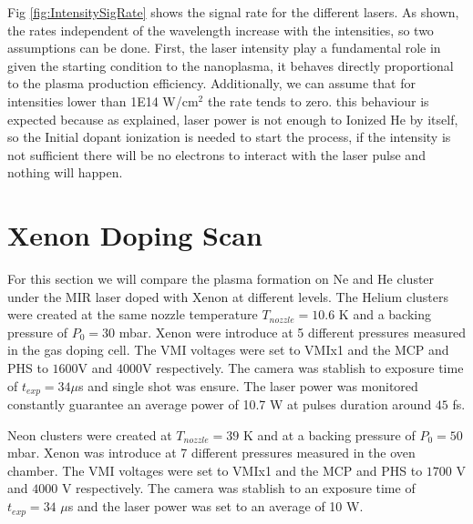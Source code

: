Fig \ref{fig:IntensitySigRate} shows the signal rate for the different lasers. As shown, the rates independent of the wavelength increase with the intensities, so two assumptions can be done. First, the laser intensity play a fundamental role in given the starting condition to the nanoplasma, it behaves directly proportional to the plasma production efficiency. Additionally, we can assume that for intensities lower than 1E14 W/cm$^{2}$ the rate tends to zero. this behaviour is expected because as explained, laser power is not enough to Ionized He by itself, so the Initial dopant ionization is needed to start the process, if the intensity is not sufficient there will be no electrons to interact with the laser pulse and nothing will happen. 

\section{Xenon Doping Scan}

For this section we will compare the plasma formation on Ne and He cluster under the MIR laser doped with Xenon at different levels. The Helium clusters were created at the same nozzle temperature $T_{nozzle}=10.6$ K and a backing pressure of $P_{0}=30$ mbar. Xenon were introduce at 5 different pressures measured in the gas doping cell. The VMI voltages were set to VMIx1 and the MCP and PHS to $1600$V and $4000$V respectively. The camera was stablish to exposure time of $t_{exp}=34 \mu$s and single shot was ensure. The laser power was monitored constantly guarantee an average power of 10.7 W at pulses duration around $45$ fs.

Neon clusters were created at $T_{nozzle}=39$ K and at a backing pressure of $P_{0}=50$ mbar. Xenon was introduce at 7 different pressures measured in the oven chamber. The VMI voltages were set to VMIx1 and the MCP and PHS to $1700$ V and $4000$ V respectively. The camera was stablish to an exposure time of $t_{exp}=34$ $\mu$s  and the laser power was set to an average of 10 W.


